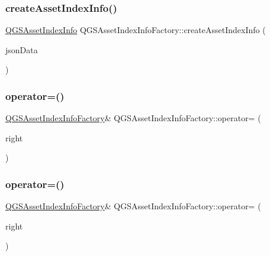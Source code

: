 \subsubsection{\texorpdfstring{create\+Asset\+Index\+Info()}{createAssetIndexInfo()}}
{\footnotesize\ttfamily \mbox{\hyperlink{class_q_g_s_asset_index_info}{Q\+G\+S\+Asset\+Index\+Info}} Q\+G\+S\+Asset\+Index\+Info\+Factory\+::create\+Asset\+Index\+Info (\begin{DoxyParamCaption}\item[{const Q\+Byte\+Array \&}]{json\+Data }\end{DoxyParamCaption})}

\mbox{\label{class_q_g_s_asset_index_info_factory_a46220fce38e2349177270ebc845d3dd5}} 
\subsubsection{\texorpdfstring{operator=()}{operator=()}\hspace{0.1cm}{\footnotesize\ttfamily [1/2]}}
{\footnotesize\ttfamily \mbox{\hyperlink{class_q_g_s_asset_index_info_factory}{Q\+G\+S\+Asset\+Index\+Info\+Factory}}\& Q\+G\+S\+Asset\+Index\+Info\+Factory\+::operator= (\begin{DoxyParamCaption}\item[{const \mbox{\hyperlink{class_q_g_s_asset_index_info_factory}{Q\+G\+S\+Asset\+Index\+Info\+Factory}} \&}]{right }\end{DoxyParamCaption})\hspace{0.3cm}{\ttfamily [delete]}}

\mbox{\label{class_q_g_s_asset_index_info_factory_a428b83daaad41f6806b68e28540965ad}} 
\subsubsection{\texorpdfstring{operator=()}{operator=()}\hspace{0.1cm}{\footnotesize\ttfamily [2/2]}}
{\footnotesize\ttfamily \mbox{\hyperlink{class_q_g_s_asset_index_info_factory}{Q\+G\+S\+Asset\+Index\+Info\+Factory}}\& Q\+G\+S\+Asset\+Index\+Info\+Factory\+::operator= (\begin{DoxyParamCaption}\item[{\mbox{\hyperlink{class_q_g_s_asset_index_info_factory}{Q\+G\+S\+Asset\+Index\+Info\+Factory}} \&\&}]{right }\end{DoxyParamCaption})\hspace{0.3cm}{\ttfamily [delete]}}




